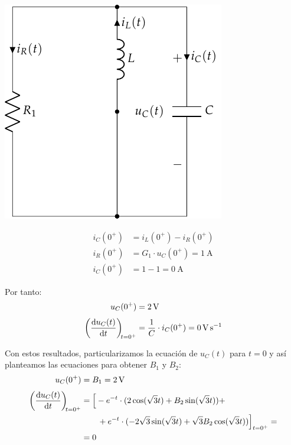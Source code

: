 \vspace{3mm}
\begin{minipage}{0.3\textwidth}
  \includegraphics[scale=0.9]{figuras/FM_4_9_natural}
\end{minipage}
\begin{minipage}{0.7\textwidth}
  \begin{align*}
    i_C(0^+) &= i_L(0^+) - i_R(0^+)\\
    i_R(0^+) &= G_1 \cdot u_C(0^+) = \SI{1}{\ampere}\\
    i_C(0^+) &= 1 - 1 = \SI{0}{\ampere}
  \end{align*}
\end{minipage}

\vspace{5mm}
Por tanto:
\begin{align*}
  u_C(0^+) &= \SI{2}{\volt}\\[3pt]
  \diff{u_C(t)}{t}[t = 0^+] &= \frac{1}{C} \cdot i_C(0^+) = \SI{0}{\volt\per\second}
\end{align*}

Con estos resultados, particularizamos la ecuación de $u_C(t)$ para
$t = 0$ y así planteamos las ecuaciones para obtener $B_1$ y $B_2$:
\begin{align*}
  u_C(0^+) &= B_1 = \SI{2}{\volt}\\[3pt]
  \diff{u_C(t)}{t}[t = 0^+] &= \Big[-e^{-t} \cdot (2\cos(\sqrt{3}t) + B_2\sin(\sqrt{3}t)) +\\
           & \qquad + e^{-t} \cdot (-2\sqrt{3}\sin(\sqrt{3}t) + \sqrt{3} B_2\cos(\sqrt{3}t)) \Big]_{t = 0^+}=\\
           &= 0
\end{align*}

